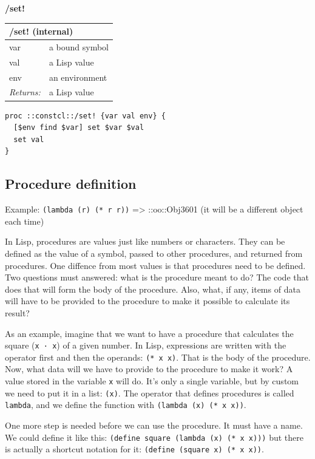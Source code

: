\documentclass[twoside,9pt]{report}
\begin{document}
\textbf{/set!}

\begin{tabular}{ |l l| }
\hline
\multicolumn{2}{|l|}{/set! (internal)} \\
\hline
var & a bound symbol \\
val & a Lisp value \\
env & an environment \\
\textit{Returns:} & a Lisp value \\
\hline
\end{tabular}

\noindent\makebox[\linewidth]{\rule{\linewidth}{0.4pt}}
\begin{lstlisting}
proc ::constcl::/set! {var val env} {
  [$env find $var] set $var $val
  set val
}
\end{lstlisting}
\noindent\makebox[\linewidth]{\rule{\linewidth}{0.4pt}}
\subsection{Procedure definition}
\label{procedure-definition}

Example: \texttt{(lambda (r) (* r r))} => ::oo::Obj3601 (it will be a different object each time)


In Lisp, procedures are values just like numbers or characters. They can be defined as the value of a symbol, passed to other procedures, and returned from procedures. One diffence from most values is that procedures need to be defined. Two questions must answered: what is the procedure meant to do? The code that does that will form the body of the procedure. Also, what, if any, items of data will have to be provided to the procedure to make it possible to calculate its result?


As an example, imagine that we want to have a procedure that calculates the square (\texttt{x · x}) of a given number. In Lisp, expressions are written with the operator first and then the operands: \texttt{(* x x)}. That is the body of the procedure. Now, what data will we have to provide to the procedure to make it work? A value stored in the variable \texttt{x} will do. It's only a single variable, but by custom we need to put it in a list: \texttt{(x)}. The operator that defines procedures is called \texttt{lambda}, and we define the function with \texttt{(lambda (x) (* x x))}.


One more step is needed before we can use the procedure. It must have a name. We could define it like this: \texttt{(define square (lambda (x) (* x x)))} but there is actually a shortcut notation for it: \texttt{(define (square x) (* x x))}.
\end{document}
